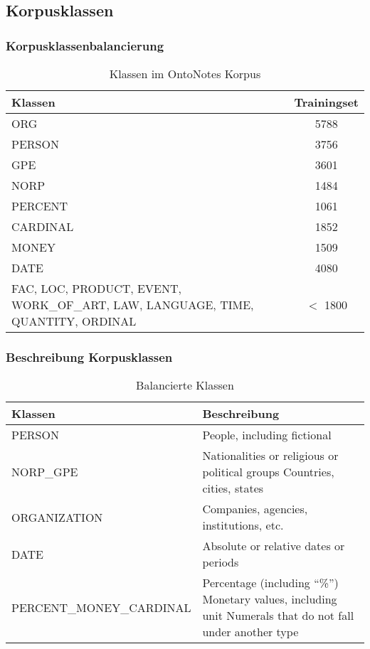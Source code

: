 \documentclass{beamer}
\begin{document}
	\subsection{Korpusklassen}
		\begin{frame}
			\frametitle{Korpusklassenbalancierung}
				\begin{table}
				\caption{Klassen im OntoNotes Korpus}
				\begin{tabularx}{\textwidth}{Xc}
					\toprule
					Klassen  & Trainingset \\
					\midrule
					ORG  & 5788 \\
					PERSON & 3756 \\
					GPE & 3601 \\
					NORP & 1484 \\
					PERCENT & 1061  \\
					CARDINAL & 1852 \\
					MONEY & 1509  \\
					DATE & 4080  \\
					FAC, LOC, PRODUCT, EVENT, WORK\_OF\_ART, LAW, LANGUAGE, TIME, QUANTITY, ORDINAL & $<$ 1800 \\
					\bottomrule
				\end{tabularx}
				\label{tab:datasets}
			\end{table}
		\end{frame}
	\begin{frame}
		\frametitle{Beschreibung Korpusklassen}
		\begin{table}
			\caption{Balancierte Klassen}
			\begin{tabularx}{\textwidth}{lX}
				\toprule
				Klassen  & Beschreibung \\
				\midrule
				PERSON 	& People, including fictional \\
				NORP\_GPE &	Nationalities or religious or political groups
				Countries, cities, states\\
				ORGANIZATION &	Companies, agencies, institutions, etc.\\
				DATE &	Absolute or relative dates or periods\\
				PERCENT\_MONEY\_CARDINAL &	Percentage (including “\%”)
				Monetary values, including unit
				Numerals that do not fall under another type \\
				\bottomrule
			\end{tabularx}
			\label{tab:datasets}
		\end{table}
	\end{frame}
	
\end{document}
